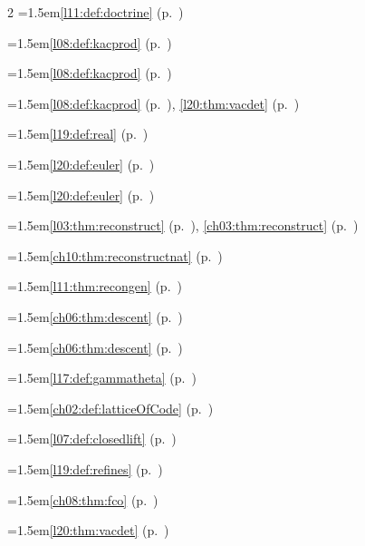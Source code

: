 \begin{multicols}{2}
\hangindent=1.5em\quad \ref{l11:def:doctrine} (p.~\pageref{l11:def:doctrine})\par
\hangindent=1.5em\quad \ref{l08:def:kacprod} (p.~\pageref{l08:def:kacprod})\par
\hangindent=1.5em\quad \ref{l08:def:kacprod} (p.~\pageref{l08:def:kacprod})\par
\hangindent=1.5em\quad \ref{l08:def:kacprod} (p.~\pageref{l08:def:kacprod}), \ref{l20:thm:vacdet} (p.~\pageref{l20:thm:vacdet})\par
\hangindent=1.5em\quad \ref{l19:def:real} (p.~\pageref{l19:def:real})\par
\hangindent=1.5em\quad \ref{l20:def:euler} (p.~\pageref{l20:def:euler})\par
\hangindent=1.5em\quad \ref{l20:def:euler} (p.~\pageref{l20:def:euler})\par
\hangindent=1.5em\quad \ref{l03:thm:reconstruct} (p.~\pageref{l03:thm:reconstruct}), \ref{ch03:thm:reconstruct} (p.~\pageref{ch03:thm:reconstruct})\par
\hangindent=1.5em\quad \ref{ch10:thm:reconstructnat} (p.~\pageref{ch10:thm:reconstructnat})\par
\hangindent=1.5em\quad \ref{l11:thm:recongen} (p.~\pageref{l11:thm:recongen})\par
\hangindent=1.5em\quad \ref{ch06:thm:descent} (p.~\pageref{ch06:thm:descent})\par
\hangindent=1.5em\quad \ref{ch06:thm:descent} (p.~\pageref{ch06:thm:descent})\par
\hangindent=1.5em\quad \ref{l17:def:gammatheta} (p.~\pageref{l17:def:gammatheta})\par
\hangindent=1.5em\quad \ref{ch02:def:latticeOfCode} (p.~\pageref{ch02:def:latticeOfCode})\par
\hangindent=1.5em\quad \ref{l07:def:closedlift} (p.~\pageref{l07:def:closedlift})\par
\hangindent=1.5em\quad \ref{l19:def:refines} (p.~\pageref{l19:def:refines})\par
\hangindent=1.5em\quad \ref{ch08:thm:fco} (p.~\pageref{ch08:thm:fco})\par
\hangindent=1.5em\quad \ref{l20:thm:vacdet} (p.~\pageref{l20:thm:vacdet})\par

\end{multicols}
